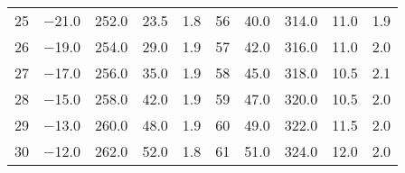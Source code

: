 \begin{table}
\begin{tabular}{S S S S S | S S S S S}
        \num{25} &  \num{-21.0} &  \num{252.0} &  \num{23.5} &  \num{1.8} & \num{56} &  \num{ 40.0} &  \num{314.0} &  \num{11.0} &  \num{1.9} \\
        \num{26} &  \num{-19.0} &  \num{254.0} &  \num{29.0} &  \num{1.9} & \num{57} &  \num{ 42.0} &  \num{316.0} &  \num{11.0} &  \num{2.0} \\
        \num{27} &  \num{-17.0} &  \num{256.0} &  \num{35.0} &  \num{1.9} & \num{58} &  \num{ 45.0} &  \num{318.0} &  \num{10.5} &  \num{2.1} \\
        \num{28} &  \num{-15.0} &  \num{258.0} &  \num{42.0} &  \num{1.9} & \num{59} &  \num{ 47.0} &  \num{320.0} &  \num{10.5} &  \num{2.0} \\
        \num{29} &  \num{-13.0} &  \num{260.0} &  \num{48.0} &  \num{1.9} & \num{60} &  \num{ 49.0} &  \num{322.0} &  \num{11.5} &  \num{2.0} \\
        \num{30} &  \num{-12.0} &  \num{262.0} &  \num{52.0} &  \num{1.8} & \num{61} &  \num{ 51.0} &  \num{324.0} &  \num{12.0} &  \num{2.0} \\
      \bottomrule
    \end{tabular}
  \end{table}

